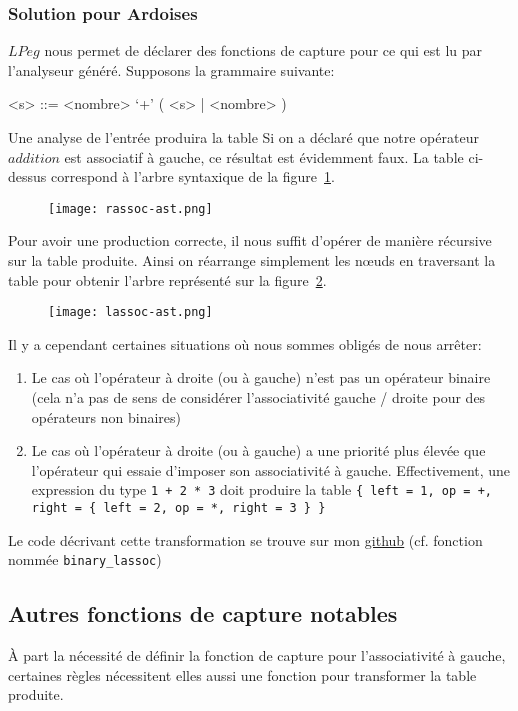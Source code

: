 \documentclass{article}
\begin{document}
\subsubsection{Solution pour Ardoises}
$LPeg$ nous permet de déclarer des fonctions de capture pour ce qui est lu par l'analyseur généré. Supposons la grammaire suivante:
\begin{grammar}
	<s> ::= <nombre> `+' ( <s> | <nombre> )
\end{grammar}
Une analyse de l'entrée  \noindent produira la table 
\noindent Si on a déclaré que notre opérateur $addition$ est associatif à gauche, ce résultat est évidemment faux. La table ci-dessus correspond à l'arbre syntaxique de la figure~\ref{fig:rassocast}. 
\begin{figure}[!h]
	\centering
	\texttt{[image: rassoc-ast.png]}
	\caption{}
	\label{fig:rassocast}
\end{figure}
Pour avoir une production correcte, il nous suffit d'opérer de manière récursive sur la table produite. Ainsi on réarrange simplement les nœuds en traversant la table pour obtenir l'arbre représenté sur la figure~\ref{fig:lassocast}.
\begin{figure}[h]
	\centering
	\texttt{[image: lassoc-ast.png]}
	\caption{}
	\label{fig:lassocast}
\end{figure}
Il y a cependant certaines situations où nous sommes obligés de nous arrêter:
\begin{enumerate}
	\item Le cas où l'opérateur à droite (ou à gauche) n'est pas un opérateur binaire (cela n'a pas de sens de considérer l'associativité gauche / droite pour des opérateurs non binaires)
	\item Le cas où l'opérateur à droite (ou à gauche) a une priorité plus élevée que l'opérateur qui essaie d'imposer son associativité à gauche. Effectivement, une expression du type \lstinline|1 + 2 * 3| doit produire la table \lstinline|{ left = 1, op = +, right = { left = 2, op = *, right = 3 } }|
\end{enumerate}
Le code décrivant cette transformation se trouve sur mon \underline{\href{https://github.com/LGabAnnell/formalisms/blob/f3cc67d58ef319d80d5895146f26f0b489c89d21/src/parser.lua\#L140}{github}} (cf. fonction nommée \lstinline|binary_lassoc|)
\subsection{Autres fonctions de capture notables}
À part la nécessité de définir la fonction de capture pour l'associativité à gauche, certaines règles nécessitent elles aussi une fonction pour transformer la table produite.
\end{document}
